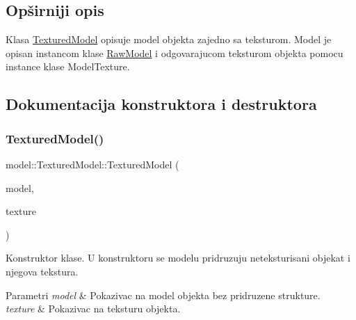 \subsection{Opširniji opis}
Klasa \hyperlink{classmodel_1_1TexturedModel}{Textured\+Model} opisuje model objekta zajedno sa teksturom. Model je opisan instancom klase \hyperlink{classmodel_1_1RawModel}{Raw\+Model} i odgovarajucom teksturom objekta pomocu instance klase Model\+Texture. 

\subsection{Dokumentacija konstruktora i destruktora}
\mbox{\label{classmodel_1_1TexturedModel_affbb36dc66a365064576e186a975777a}} 
\subsubsection{\texorpdfstring{Textured\+Model()}{TexturedModel()}}
{\footnotesize\ttfamily model\+::\+Textured\+Model\+::\+Textured\+Model (\begin{DoxyParamCaption}\item[{\hyperlink{classmodel_1_1RawModel}{Raw\+Model} $\ast$}]{model,  }\item[{\hyperlink{classtexture_1_1Texture}{Model\+Texture} $\ast$}]{texture }\end{DoxyParamCaption})}



Konstruktor klase. U konstruktoru se modelu pridruzuju neteksturisani objekat i njegova tekstura. 


\begin{DoxyParams}{Parametri}
{\em model} & Pokazivac na model objekta bez pridruzene strukture. \\
\hline
{\em texture} & Pokazivac na teksturu objekta. \\
\hline
\end{DoxyParams}
\mbox{\label{classmodel_1_1TexturedModel_a8a11ba96d5a73a962a2ffcf8c5a53afe}} 
